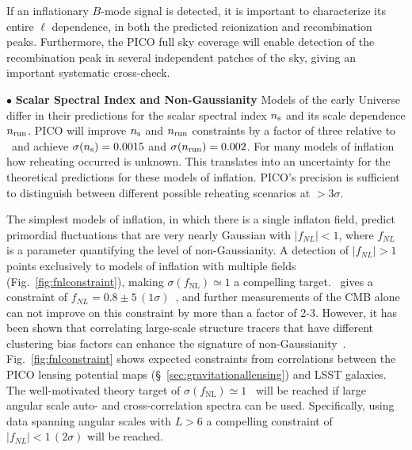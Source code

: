 \documentclass[PICOReport.tex]{subfiles}
\begin{document}
If an inflationary $B$-mode signal is detected, it is important to characterize its entire $\ell$ dependence, in both the predicted reionization and  recombination peaks.  Furthermore, the PICO full sky coverage will enable detection of the recombination peak in several independent patches of the sky, giving an important systematic cross-check. 

\noindent$\bullet$ {\bf Scalar Spectral Index and Non-Gaussianity} \hspace{0.1in} Models of the early Universe  differ in their predictions for the scalar spectral index $n_{\rm s}$ and its scale dependence $n_{\rm run}$. PICO will improve $n_{\rm s}$ and $n_{\rm run}$ constraints by a factor of three relative to \planck\ and achieve $\sigma(n_{\rm s})=0.0015$ and $\sigma(n_{\rm run})=0.002$. For many models of inflation how reheating occurred is unknown. This translates into an uncertainty for the theoretical predictions for these models of inflation. PICO's precision is sufficient to distinguish between different possible reheating scenarios at $>3\sigma$.  

The simplest models of inflation, in which there is a single inflaton field, predict primordial fluctuations that are very nearly Gaussian with $|f_{NL}| <1$, where $f_{NL}$ is a parameter quantifying the level of non-Gaussianity. A detection of $|f_{NL}| >1$ points exclusively to models of inflation with multiple fields (Fig.~\ref{fig:fnlconstraint}), making $\sigma (f_\mathrm{NL}) \simeq 1$ a compelling target. \planck\ gives a constraint of $f_{NL} = 0.8 \pm 5 \, (1\sigma)$~\citep{planck2015_17}, and further measurements of the \ac{CMB} alone can not improve on this constraint by more than a factor of 2-3.  However, it has been shown that correlating large-scale structure tracers that have different clustering bias factors can enhance the signature of non-Gaussianity~\citep{2009PhRvL.102b1302S,2018PhRvD..97l3540S,2008PhRvD..77l3514D}. Fig.~\ref{fig:fnlconstraint} shows expected constraints from correlations between the PICO lensing potential maps (\S~\ref{sec:gravitationallensing}) and LSST galaxies. 
The well-motivated theory target of $\sigma (f_\mathrm{NL}) \simeq 1$~\citep{2014arXiv1412.4671A} will be reached if large angular scale auto- and cross-correlation spectra can be used. Specifically, using data spanning angular scales with $L>6$ a compelling constraint of $|f_{NL}|<1\, (2\sigma)$ will be reached. 

\end{document}
